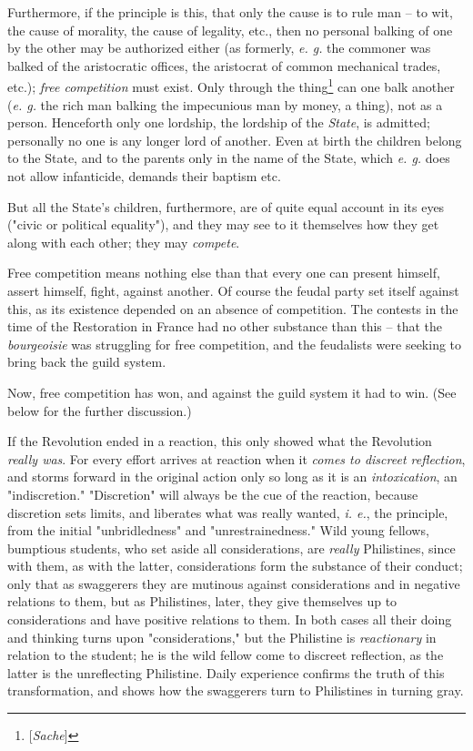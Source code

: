 \documentclass[a4paper]{book}
\begin{document}
Furthermore, if the principle is this, that only the cause is to rule man -- 
to wit, the cause of morality, the cause of legality, etc., then no personal 
balking of one by the other may be authorized either (as formerly, \textit{e. 
g.} the commoner was balked of the aristocratic offices, the aristocrat of 
common mechanical trades, etc.); \textit{free competition} must exist. Only 
through the thing\footnote{[\textit{Sache}]} can one balk another (\textit{e. 
g.} the rich man balking the impecunious man by money, a thing), not as a 
person. Henceforth only one lordship, the lordship of the \textit{State}, is 
admitted; personally no one is any longer lord of another. Even at birth the 
children belong to the State, and to the parents only in the name of the 
State, which \textit{e. g.} does not allow infanticide, demands their baptism 
etc.

But all the State's children, furthermore, are of quite equal account in its 
eyes ("{}civic or political equality"{}), and they may see to it themselves 
how they get along with each other; they may \textit{compete}.

Free competition means nothing else than that every one can present himself, 
assert himself, fight, against another. Of course the feudal party set itself 
against this, as its existence depended on an absence of competition. The 
contests in the time of the Restoration in France had no other substance than 
this -- that the \textit{bourgeoisie} was struggling for free competition, and 
the feudalists were seeking to bring back the guild system.

Now, free competition has won, and against the guild system it had to win. 
(See below for the further discussion.)

If the Revolution ended in a reaction, this only showed what the Revolution 
\textit{really was}. For every effort arrives at reaction when it 
\textit{comes to discreet reflection}, and storms forward in the original 
action only so long as it is an \textit{intoxication}, an "{}indiscretion."{} 
"{}Discretion"{} will always be the cue of the reaction, because discretion 
sets limits, and liberates what was really wanted, \textit{i. e.}, the 
principle, from the initial "{}unbridledness"{} and "{}unrestrainedness."{} 
Wild young fellows, bumptious students, who set aside all considerations, are 
\textit{really} Philistines, since with them, as with the latter, 
considerations form the substance of their conduct; only that as swaggerers 
they are mutinous against considerations and in negative relations to them, 
but as Philistines, later, they give themselves up to considerations and have 
positive relations to them. In both cases all their doing and thinking turns 
upon "{}considerations,"{} but the Philistine is \textit{reactionary} in 
relation to the student; he is the wild fellow come to discreet reflection, as 
the latter is the unreflecting Philistine. Daily experience confirms the truth 
of this transformation, and shows how the swaggerers turn to Philistines in 
turning gray.
\end{document}
